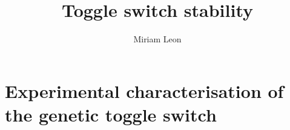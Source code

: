 \documentclass[]{chapter_only}
\title{Toggle switch stability}
\author{Miriam Leon}
\begin{document}

\tableofcontents*
{}


\mainmatter*
\chapter{Experimental characterisation of the genetic toggle switch}


\printbibliography
\end{document}
